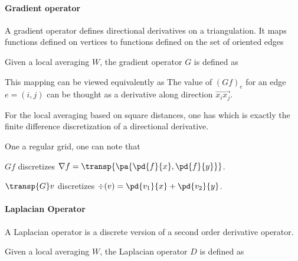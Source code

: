 \paragraph{Gradient operator}

A gradient operator defines directional derivatives on a triangulation. It maps functions defined on vertices to functions defined on the set of oriented edges

\begin{defn}[Gradient] Given a local averaging $W$, the gradient operator $G$ is defined as
\end{defn}

This mapping can be viewed equivalently as
The value of $(G f)_e$ for an edge $e=(i,j)$ can be thought as a derivative along direction $\overrightarrow{x_i x_j}$.

\begin{exmp} For the local averaging based on square distances, one has
	which is exactly the finite difference discretization of a directional derivative. 
\end{exmp}

One a regular grid, one can note that
\begin{rs}
	\item $G f$ discretizes $\nabla f = \transp{\pa{ \pd{f}{x},\pd{f}{y}} }$.
	\item $\transp{G} v$ discretizes $\div(v) = \pd{v_1}{x}+\pd{v_2}{y}$.
\end{rs}

\paragraph{Laplacian Operator}

A Laplacian operator is a discrete version of a second order derivative operator. 

\begin{defn}[Laplacian] Given a local averaging $W$, the Laplacian operator $D$ is defined as
\end{defn}

